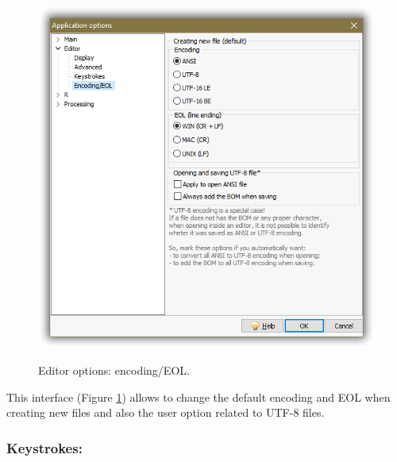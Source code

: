 \begin{figure}[h!]
  \includegraphics[scale=0.50]{./res/app_editor_encoding.png}\\
  \caption{Editor options: encoding/EOL.}
  \label{fig:editor_encoding}
\end{figure}

This interface
(Figure \ref{fig:editor_encoding})
allows to change the default encoding and EOL when creating new files and
also the user option related to UTF-8 files.


\hypertarget{working_editor_keystrokes}{}
\subsubsection{Keystrokes:}

